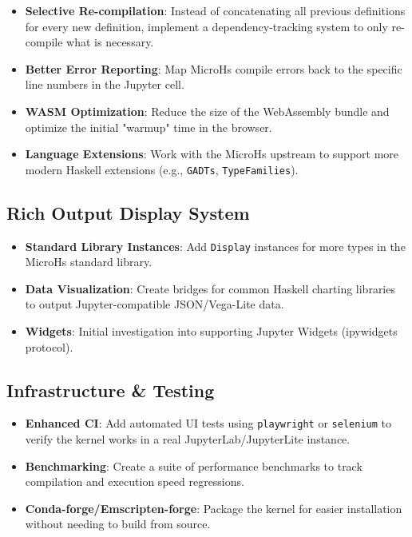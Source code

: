 \documentclass[11pt]{scrartcl}
\newcommand{\tododone}{\textcolor{green!45!black}{\ding{51}}}
\newcommand{\todopending}{\textcolor{red!65!black}{\ding{55}}}
\newcommand{\todoplanned}{\textcolor{blue!70!black}{$\mathbb{P}$}}
\begin{document}
\begin{itemize}[leftmargin=*,itemsep=0.45em]
\item[\todopending] \textbf{Selective Re-compilation}: Instead of concatenating all previous definitions for every new definition, implement a dependency-tracking system to only re-compile what is necessary.
\item[\todopending] \textbf{Better Error Reporting}: Map MicroHs compile errors back to the specific line numbers in the Jupyter cell.
\item[\todopending] \textbf{WASM Optimization}: Reduce the size of the WebAssembly bundle and optimize the initial "warmup" time in the browser.
\item[\tododone] \textbf{Language Extensions}: Work with the MicroHs upstream to support more modern Haskell extensions (e.g., \texttt{GADTs}, \texttt{TypeFamilies}).
\end{itemize}


\subsection{Rich Output Display System}


\begin{itemize}[leftmargin=*,itemsep=0.45em]
\item[\todoplanned] \textbf{Standard Library Instances}: Add \texttt{Display} instances for more types in the MicroHs standard library.
\item[\todoplanned] \textbf{Data Visualization}: Create bridges for common Haskell charting libraries to output Jupyter-compatible JSON/Vega-Lite data.
\item[\todoplanned] \textbf{Widgets}: Initial investigation into supporting Jupyter Widgets (ipywidgets protocol).
\end{itemize}


\subsection{Infrastructure \& Testing}


\begin{itemize}[leftmargin=*,itemsep=0.45em]
\item[\todoplanned] \textbf{Enhanced CI}: Add automated UI tests using \texttt{playwright} or \texttt{selenium} to verify the kernel works in a real JupyterLab/JupyterLite instance.
\item[\todoplanned] \textbf{Benchmarking}: Create a suite of performance benchmarks to track compilation and execution speed regressions.
\item[\todoplanned] \textbf{Conda-forge/Emscripten-forge}: Package the kernel for easier installation without needing to build from source.
\end{itemize}
\end{document}
